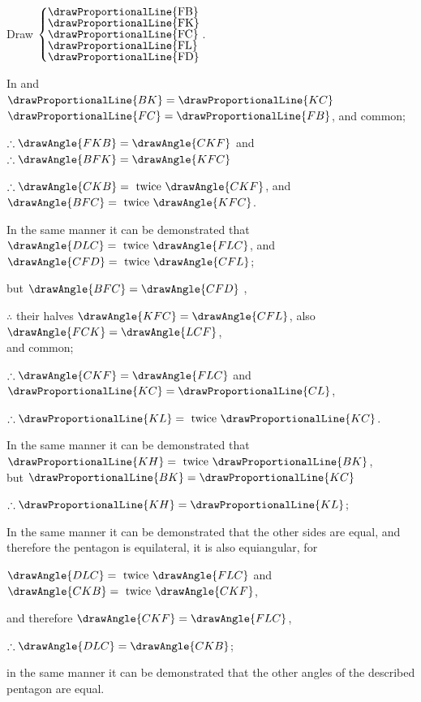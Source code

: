 \documentclass[booklanguage=english]{byrnebook}
\begin{document}
\begin{center}
Draw
$\left\{\vcenter{
\nointerlineskip\hbox{\drawProportionalLine{FB}}
\nointerlineskip\hbox{\drawProportionalLine{FK}}
\nointerlineskip\hbox{\drawProportionalLine{FC}}
\nointerlineskip\hbox{\drawProportionalLine{FL}}
\nointerlineskip\hbox{\drawProportionalLine{FD}}
}\right.$.

In  and \\
$\drawProportionalLine{BK} = \drawProportionalLine{KC}$  \\
$\drawProportionalLine{FC} = \drawProportionalLine{FB}$, and  common;

$\therefore \drawAngle{FKB} = \drawAngle{CKF}$ and $\therefore \drawAngle{BFK} = \drawAngle{KFC}$ 

$\therefore \drawAngle{CKB} = \mbox{ twice } \drawAngle{CKF}$, and $\drawAngle{BFC} = \mbox{ twice } \drawAngle{KFC}$.

In the same manner it can be demonstrated that\\
$\drawAngle{DLC} = \mbox{ twice } \drawAngle{FLC}$, and $\drawAngle{CFD} = \mbox{ twice } \drawAngle{CFL}$;

but $\drawAngle{BFC} = \drawAngle{CFD}$ ,

$\therefore$ their halves $\drawAngle{KFC} = \drawAngle{CFL}$, also $\drawAngle{FCK} = \drawAngle{LCF}$,\\
and  common;

$\therefore \drawAngle{CKF} = \drawAngle{FLC}$ and $\drawProportionalLine{KC} = \drawProportionalLine{CL}$,

$\therefore \drawProportionalLine{KL} = \mbox{ twice } \drawProportionalLine{KC}$.

In the same manner it can be demonstrated that $\drawProportionalLine{KH} = \mbox{ twice } \drawProportionalLine{BK}$,\\
but $\drawProportionalLine{BK} = \drawProportionalLine{KC}$

$\therefore \drawProportionalLine{KH} = \drawProportionalLine{KL}$;
\end{center}

In the same manner it can be demonstrated that the other sides are equal, and therefore the pentagon is equilateral, it is also equiangular, for

\begin{center}
$\drawAngle{DLC} = \mbox{ twice } \drawAngle{FLC}$ and $\drawAngle{CKB} = \mbox{ twice } \drawAngle{CKF}$,

and therefore $ \drawAngle{CKF} = \drawAngle{FLC}$,

$\therefore \drawAngle{DLC} = \drawAngle{CKB}$;

in the same manner it can be demonstrated that the other angles of the described pentagon are equal.
\end{center}
\end{document}
